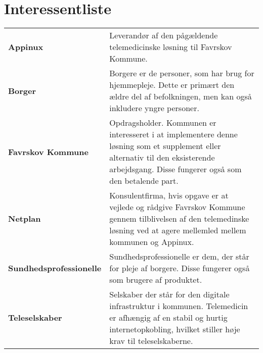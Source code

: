 \documentclass[10pt,a4paper]{article}
\begin{document}
\section{Interessentliste}

\begin{table}[H]
\begin{tabularx}{\linewidth}{lX}

\textbf{Appinux} & Leverandør af den pågældende telemedicinske løsning til Favrskov Kommune.\\
[3ex]
\textbf{Borger} & Borgere er de personer, som har brug for hjemmepleje. Dette er primært den ældre del af befolkningen, men kan også inkludere yngre personer. \\ 
[3ex]
\textbf{Favrskov Kommune} & Opdragsholder. Kommunen er interesseret i at implementere denne løsning som et supplement eller alternativ til den eksisterende arbejdsgang. Disse fungerer også som den betalende part.\\
[3ex]
\textbf{Netplan} & Konsulentfirma, hvis opgave er at vejlede og rådgive Favrskov Kommune gennem tilblivelsen af den telemedinske løsning ved at agere mellemled mellem kommunen og Appinux.\\
[3ex]
\textbf{Sundhedsprofessionelle} & Sundhedsprofessionelle er dem, der står for pleje af borgere. Disse fungerer også som brugere af produktet. \\
[3ex]
\textbf{Teleselskaber} & Selskaber der står for den digitale infrastruktur i kommunen. Telemedicin er afhængig af en stabil og hurtig internetopkobling, hvilket stiller høje krav til teleselskaberne.\\

\end{tabularx}
\end{table}
\end{document}
